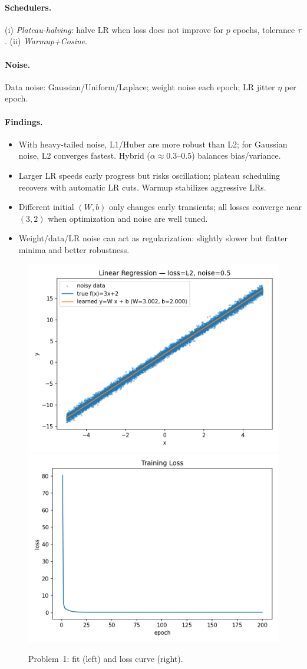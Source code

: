 \documentclass{article}
\begin{document}
\paragraph{Schedulers.} (i) \emph{Plateau-halving}: halve LR when loss does not improve for $p$ epochs, tolerance $\tau$. (ii) \emph{Warmup+Cosine}.
\paragraph{Noise.} Data noise: Gaussian/Uniform/Laplace; weight noise each epoch; LR jitter $\eta$ per epoch.

\paragraph{Findings.} 
\begin{itemize}
\item With heavy-tailed noise, L1/Huber are more robust than L2; for Gaussian noise, L2 converges fastest. Hybrid ($\alpha\!\approx\!0.3\text{--}0.5$) balances bias/variance.
\item Larger LR speeds early progress but risks oscillation; plateau scheduling recovers with automatic LR cuts. Warmup stabilizes aggressive LRs.
\item Different initial $(W,b)$ only changes early transients; all losses converge near $(3,2)$ when optimization and noise are well tuned.
\item Weight/data/LR noise can act as regularization: slightly slower but flatter minima and better robustness.
\end{itemize}

\begin{figure}[t]
\centering
\includegraphics[width=.48\linewidth]{figs/linreg_l2_lr0.05_noise0.5_seed808_fit.png}\hfill
\includegraphics[width=.48\linewidth]{figs/linreg_l2_lr0.05_noise0.5_seed808_loss.png}
\caption{Problem~1: fit (left) and loss curve (right).}
\label{fig:lin}
\end{figure}
\end{document}
